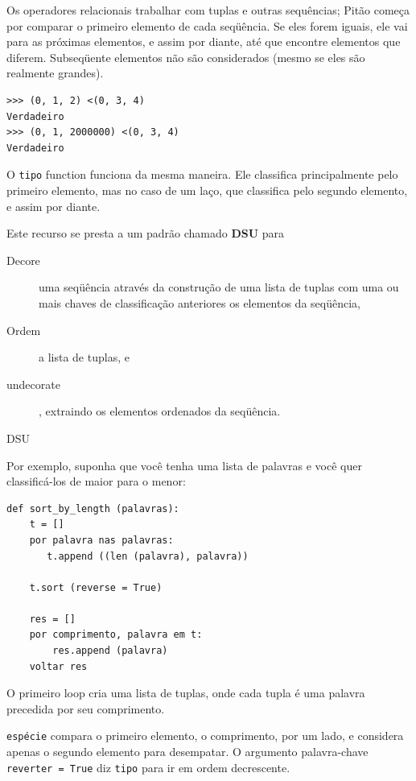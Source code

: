 \documentclass[10pt]{book}
\begin{document}
\begin{exercise}
\begin{v erbatim}
Os operadores relacionais trabalhar com tuplas e outras sequências;
Pitão começa por comparar o primeiro elemento de cada
seqüência. Se eles forem iguais, ele vai para as próximas elementos,
e assim por diante, até que encontre elementos que diferem. Subseqüente
elementos não são considerados (mesmo se eles são realmente grandes).

\begin{verbatim}
>>> (0, 1, 2) <(0, 3, 4)
Verdadeiro
>>> (0, 1, 2000000) <(0, 3, 4)
Verdadeiro
\end{verbatim}
%
O {\tt tipo} function funciona da mesma maneira. Ele classifica
principalmente pelo primeiro elemento, mas no caso de um laço, que classifica
pelo segundo elemento, e assim por diante.  

Este recurso se presta a um padrão chamado {\bf DSU} para 

\begin{description}

\item[Decore] uma seqüência através da construção de uma lista de tuplas
com uma ou mais chaves de classificação anteriores os elementos da seqüência,

\item[Ordem] a lista de tuplas, e

\item[undecorate], extraindo os elementos ordenados da seqüência.

\end{description}

\label{} DSU

Por exemplo, suponha que você tenha uma lista de palavras e você quer
classificá-los de maior para o menor:

\begin{verbatim}
def sort_by_length (palavras):
    t = []
    por palavra nas palavras:
       t.append ((len (palavra), palavra))

    t.sort (reverse = True)

    res = []
    por comprimento, palavra em t:
        res.append (palavra)
    voltar res
\end{verbatim}
%
O primeiro loop cria uma lista de tuplas, onde cada
tupla é uma palavra precedida por seu comprimento.

{\tt espécie} compara o primeiro elemento, o comprimento, por um lado, e
considera apenas o segundo elemento para desempatar. O argumento palavra-chave
{\tt reverter = True} diz {\tt tipo} para ir em ordem decrescente.


\end{v erbatim}
\end{exercise}
\end{document}
